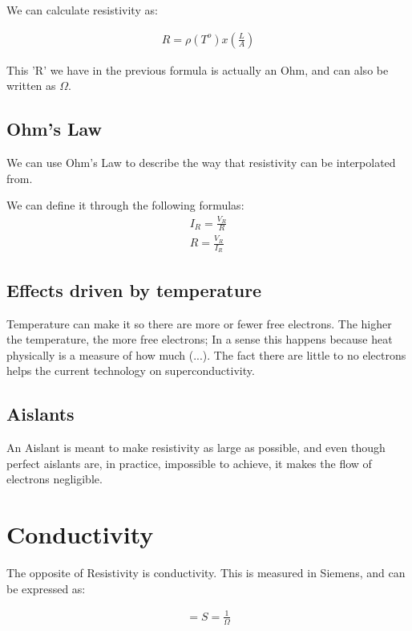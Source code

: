\documentclass[11pt,fleqn]{book} %
\begin{document}
We can calculate resistivity as:

\begin{gather}
    R = \rho(T^o) x (\frac{L}{A})
\end{gather}

This 'R' we have in the previous formula is actually an Ohm, and can also be written as $\Omega$.

\subsection{Ohm's Law}

We can use Ohm's Law to describe the way that resistivity can be interpolated from.

We can define it through the following formulas:
\begin{gather}
    I_R = \frac{V_R}{R}\\
    R = \frac{V_R}{I_R}
\end{gather}

\subsection{Effects driven by temperature}

Temperature can make it so there are more or fewer free electrons. The higher the temperature, the more free electrons;
In a sense this happens because heat physically is a measure of how much (...). The fact there are little to no electrons helps 
the current technology on superconductivity.   

\subsection{Aislants}

An Aislant is meant to make resistivity as large as possible, and even though perfect aislants are, in practice, impossible to achieve,
it makes the flow of electrons negligible. 

\section{Conductivity}

The opposite of Resistivity is conductivity. This is measured in Siemens, and can be expressed as:

\begin{gather}
    [G] = S = \frac{1}{\Omega}
\end{gather}
\end{document}
